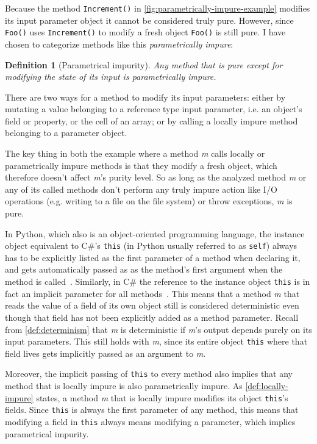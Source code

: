 \documentclass[a4paper,12pt]{article}
\newtheorem{definition}{Definition} %
\begin{document}
Because the method \texttt{Increment()} in \autoref{fig:parametrically-impure-example} modifies its input parameter object it cannot be considered truly pure. However, since \texttt{Foo()} uses \texttt{Increment()} to modify a fresh object \texttt{Foo()} is still pure. I have chosen to categorize methods like this \textit{parametrically impure}:

\begin{definition}[Parametrical impurity] \label{def:parametrically-impure}
  Any method that is pure except for modifying the state of its input is parametrically impure.
\end{definition}

There are two ways for a method to modify its input parameters: either by mutating a value belonging to a reference type input parameter, i.e. an object's field or property, or the cell of an array; or by calling a locally impure method belonging to a parameter object.

The key thing in both the example where a method \textit{m} calls locally or parametrically impure methods is that they modify a fresh object, which therefore doesn't affect \textit{m}'s purity level. So as long as the analyzed method \textit{m} or any of its called methods don't perform any truly impure action like I/O operations (e.g. writing to a file on the file system) or throw exceptions, \textit{m} is pure.

In Python, which also is an object-oriented programming language, the instance object equivalent to C\#'s \texttt{this} (in Python usually referred to as \texttt{self}) always has to be explicitly listed as the first parameter of a method when declaring it, and gets automatically passed as as the method's first argument when the method is called~\cite{python-classes}. Similarly, in C\# the reference to the instance object \texttt{this} is in fact an implicit parameter for all methods~\cite{michaelis2018essential}. This means that a method \textit{m} that reads the value of a field of its own object still is considered deterministic even though that field has not been explicitly added as a method parameter. Recall from \autoref{def:determinism} that \textit{m} is deterministic if \textit{m}'s output depends purely on its input parameters. This still holds with \textit{m}, since its entire object \texttt{this} where that field lives gets implicitly passed as an argument to \textit{m}.

Moreover, the implicit passing of \texttt{this} to every method also implies that any method that is locally impure is also parametrically impure. As \autoref{def:locally-impure} states, a method \textit{m} that is locally impure modifies its object \texttt{this}'s fields. Since \texttt{this} is always the first parameter of any method, this means that modifying a field in \texttt{this} always means modifying a parameter, which implies parametrical impurity.
\end{document}
